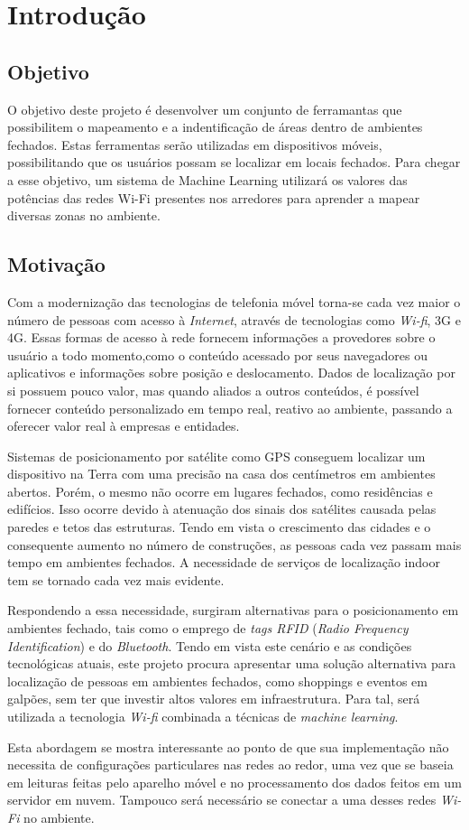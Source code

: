 \chapter{Introdução}\label{chp:introduction}

\section{Objetivo}\label{sec:objetctive}
O objetivo deste projeto é desenvolver um conjunto de ferramantas que possibilitem
o mapeamento e a indentificação de áreas dentro de ambientes fechados. Estas
ferramentas serão utilizadas em dispositivos móveis, possibilitando que os
usuários possam se localizar em locais fechados. Para chegar a esse objetivo, um
sistema de Machine Learning utilizará os valores das potências das redes Wi-Fi
presentes nos arredores para aprender a mapear diversas zonas no ambiente.

\section{Motivação}\label{sec:motivation}
Com a modernização das tecnologias de telefonia móvel torna-se cada vez maior o
número de pessoas com acesso à \textit{Internet}, através de tecnologias como \textit{Wi-fi},
3G e 4G. Essas formas de acesso à rede fornecem informações a provedores sobre o
usuário a todo momento,como o conteúdo acessado por seus navegadores ou aplicativos
e informações sobre posição e deslocamento. Dados de localização por si possuem
pouco valor, mas quando aliados a outros conteúdos, é possível fornecer conteúdo
personalizado em tempo real, reativo ao ambiente, passando a oferecer valor real
à empresas e entidades.
\par
Sistemas de posicionamento por satélite como GPS conseguem localizar um dispositivo
na Terra com uma precisão na casa dos centímetros em ambientes abertos. Porém,
o mesmo não ocorre em lugares fechados, como residências e edifícios. Isso ocorre
devido à atenuação dos sinais dos satélites causada pelas paredes e tetos das
estruturas. Tendo em vista o crescimento das cidades e o consequente aumento no
número de construções, as pessoas cada vez passam mais tempo em ambientes
fechados. A necessidade de serviços de localização indoor tem se tornado cada
vez mais evidente.
\par
Respondendo a essa necessidade, surgiram alternativas para o posicionamento em
ambientes fechado, tais como o emprego de \textit{tags RFID} (\textit{Radio Frequency Identification}) e do \textit{Bluetooth}. Tendo em vista este
cenário e as condições tecnológicas atuais, este projeto procura apresentar uma
solução alternativa para localização de pessoas em ambientes fechados, como shoppings e
eventos em galpões, sem ter que investir altos valores em infraestrutura. Para tal, será utilizada a tecnologia \textit{Wi-fi} combinada a técnicas de \textit{machine learning}.
\par
Esta abordagem se mostra interessante ao ponto de que sua implementação não
necessita de configurações particulares nas redes ao redor, uma vez que se baseia
em leituras feitas pelo aparelho móvel e no processamento dos dados feitos em um
servidor em nuvem. Tampouco será necessário se conectar a uma desses redes
\textit{Wi-Fi} no ambiente.
